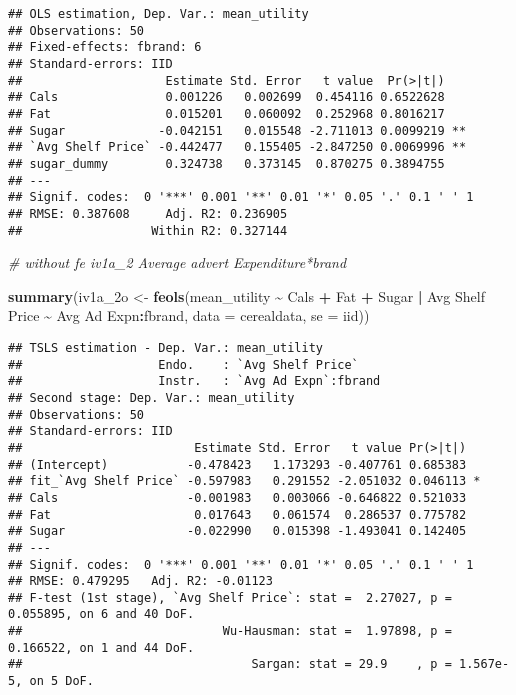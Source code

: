 \documentclass[
]{article}
\newenvironment{Shaded}{\begin{snugshade}}{\end{snugshade}}
\newcommand{\AttributeTok}[1]{\textcolor[rgb]{0.13,0.29,0.53}{#1}}
\newcommand{\CommentTok}[1]{\textcolor[rgb]{0.56,0.35,0.01}{\textit{#1}}}
\newcommand{\FunctionTok}[1]{\textcolor[rgb]{0.13,0.29,0.53}{\textbf{#1}}}
\newcommand{\NormalTok}[1]{#1}
\newcommand{\OtherTok}[1]{\textcolor[rgb]{0.56,0.35,0.01}{#1}}
\newcommand{\SpecialCharTok}[1]{\textcolor[rgb]{0.81,0.36,0.00}{\textbf{#1}}}
\newcommand{\StringTok}[1]{\textcolor[rgb]{0.31,0.60,0.02}{#1}}
\begin{document}
\begin{verbatim}
## OLS estimation, Dep. Var.: mean_utility
## Observations: 50
## Fixed-effects: fbrand: 6
## Standard-errors: IID 
##                    Estimate Std. Error   t value  Pr(>|t|)    
## Cals               0.001226   0.002699  0.454116 0.6522628    
## Fat                0.015201   0.060092  0.252968 0.8016217    
## Sugar             -0.042151   0.015548 -2.711013 0.0099219 ** 
## `Avg Shelf Price` -0.442477   0.155405 -2.847250 0.0069996 ** 
## sugar_dummy        0.324738   0.373145  0.870275 0.3894755    
## ---
## Signif. codes:  0 '***' 0.001 '**' 0.01 '*' 0.05 '.' 0.1 ' ' 1
## RMSE: 0.387608     Adj. R2: 0.236905
##                  Within R2: 0.327144
\end{verbatim}

\begin{Shaded}
\begin{Highlighting}[]
\CommentTok{\# without fe  iv1a\_2 Average advert Expenditure*brand }

\FunctionTok{summary}\NormalTok{(iv1a\_2o }\OtherTok{\textless{}{-}} \FunctionTok{feols}\NormalTok{(mean\_utility }\SpecialCharTok{\textasciitilde{}}\NormalTok{ Cals }\SpecialCharTok{+}\NormalTok{ Fat }\SpecialCharTok{+}\NormalTok{ Sugar }\SpecialCharTok{|} \StringTok{\textasciigrave{}}\AttributeTok{Avg Shelf Price}\StringTok{\textasciigrave{}} \SpecialCharTok{\textasciitilde{}} \StringTok{\textasciigrave{}}\AttributeTok{Avg Ad Expn}\StringTok{\textasciigrave{}}\SpecialCharTok{:}\NormalTok{fbrand, }\AttributeTok{data =}\NormalTok{ cerealdata, }\AttributeTok{se =} \StringTok{\textquotesingle{}iid\textquotesingle{}}\NormalTok{))}
\end{Highlighting}
\end{Shaded}

\begin{verbatim}
## TSLS estimation - Dep. Var.: mean_utility
##                   Endo.    : `Avg Shelf Price`
##                   Instr.   : `Avg Ad Expn`:fbrand
## Second stage: Dep. Var.: mean_utility
## Observations: 50
## Standard-errors: IID 
##                        Estimate Std. Error   t value Pr(>|t|)    
## (Intercept)           -0.478423   1.173293 -0.407761 0.685383    
## fit_`Avg Shelf Price` -0.597983   0.291552 -2.051032 0.046113 *  
## Cals                  -0.001983   0.003066 -0.646822 0.521033    
## Fat                    0.017643   0.061574  0.286537 0.775782    
## Sugar                 -0.022990   0.015398 -1.493041 0.142405    
## ---
## Signif. codes:  0 '***' 0.001 '**' 0.01 '*' 0.05 '.' 0.1 ' ' 1
## RMSE: 0.479295   Adj. R2: -0.01123
## F-test (1st stage), `Avg Shelf Price`: stat =  2.27027, p = 0.055895, on 6 and 40 DoF.
##                            Wu-Hausman: stat =  1.97898, p = 0.166522, on 1 and 44 DoF.
##                                Sargan: stat = 29.9    , p = 1.567e-5, on 5 DoF.
\end{verbatim}
\end{document}
